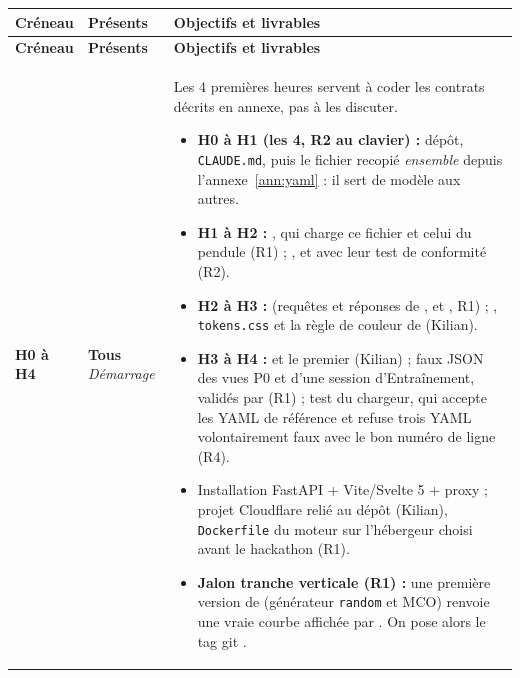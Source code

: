 \documentclass[11pt,a4paper]{article}
\begin{document}
\renewcommand{\arraystretch}{1.15}
\begin{longtable}{@{}L{1.9cm} L{2.4cm} >{\raggedright\arraybackslash}p{\dimexpr\textwidth-4.3cm-4\tabcolsep\relax}@{}}
  \toprule
  \textbf{Créneau} & \textbf{Présents} & \textbf{Objectifs et livrables} \\
  \midrule
  \endfirsthead
  \toprule
  \textbf{Créneau} & \textbf{Présents} & \textbf{Objectifs et livrables} \\
  \midrule
  \endhead
  \bottomrule
  \endfoot

  \textbf{H0 à H4}  &
  \textbf{Tous} \newline \emph{Démarrage} &
  Les 4 premières heures servent à coder les contrats décrits en annexe, pas à les discuter.
  \begin{itemize}[leftmargin=*, nosep]
    \item \textbf{H0 à H1 (les 4, R2 au clavier) :} dépôt, \texttt{CLAUDE.md}, puis le fichier  recopié \emph{ensemble} depuis l'annexe~\ref{ann:yaml} : il sert de modèle aux autres.
    \item \textbf{H1 à H2 :} , qui charge ce fichier et celui du pendule (R1) ; ,  et  avec leur test de conformité (R2).
    \item \textbf{H2 à H3 :}  (requêtes et réponses de ,  et , R1) ; , \texttt{tokens.css} et la règle de couleur de  (Kilian).
    \item \textbf{H3 à H4 :}  et le premier  (Kilian) ; faux JSON des vues P0 et d'une session d'Entraînement, validés par  (R1) ; test du chargeur, qui accepte les YAML de référence et refuse trois YAML volontairement faux avec le bon numéro de ligne (R4).
    \item Installation FastAPI + Vite/Svelte 5 + proxy  ; projet Cloudflare relié au dépôt (Kilian), \texttt{Dockerfile} du moteur sur l'hébergeur choisi avant le hackathon (R1).
    \item \textbf{Jalon tranche verticale (R1) :} une première version de  (générateur \texttt{random} et MCO) renvoie une vraie courbe affichée par . On pose alors le tag git .
  \end{itemize} \\
  \midrule


\end{longtable}
\end{document}
